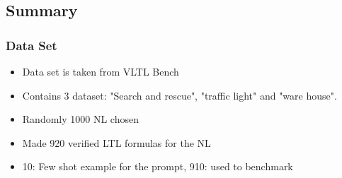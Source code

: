 \subsection{Summary}
\begin{frame}
  \frametitle{Data Set}
  \begin{itemize}
      \item Data set is taken from VLTL Bench
      \item Contains 3 dataset: "Search and rescue", "traffic light" and "ware house".
      \item Randomly 1000 NL chosen
      \item Made 920 verified LTL formulas for the NL
      \item 10: Few shot example for the prompt, 910: used to benchmark
  \end{itemize}
\end{frame}
